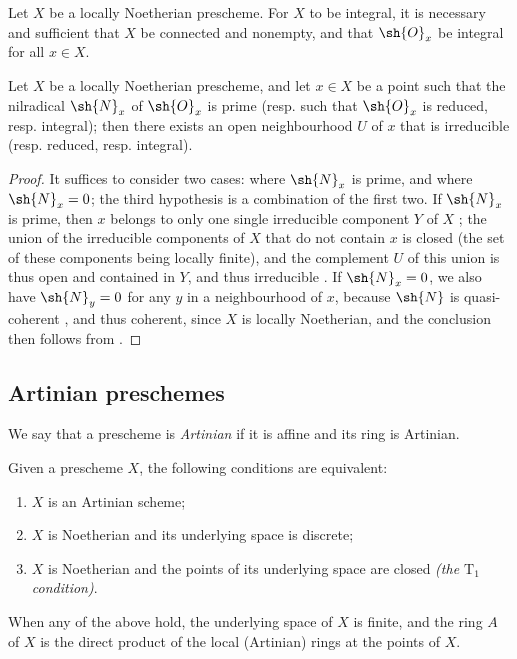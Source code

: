 \begin{corollary}[6.1.12]
\label{I.6.1.12}
Let $X$ be a locally Noetherian prescheme.
For $X$ to be integral, it is necessary and sufficient that $X$ be connected and nonempty, and that $\sh{O}_x$ be integral for all $x\in X$.
\end{corollary}

\begin{proposition}[6.1.13]
\label{I.6.1.13}
Let $X$ be a locally Noetherian prescheme, and let $x\in X$ be a point such that the nilradical $\sh{N}_x$ of $\sh{O}_x$ is prime (resp. such that $\sh{O}_x$ is reduced, resp. integral);
then there exists an open neighbourhood $U$ of $x$ that is irreducible (resp. reduced, resp. integral).
\end{proposition}

\begin{proof}
It suffices to consider two cases: where $\sh{N}_x$ is prime, and where $\sh{N}_x=0$; the third hypothesis is a combination of the first two.
If $\sh{N}_x$ is prime, then $x$ belongs to only one single irreducible component $Y$ of $X$ ;
the union of the irreducible components of $X$ that do not contain $x$ is closed (the set of these components being locally finite), and the complement $U$ of this union is thus open and contained in $Y$, and thus irreducible .
If $\sh{N}_x=0$, we also have $\sh{N}_y=0$ for any $y$ in a neighbourhood of $x$, because $\sh{N}$ is quasi-coherent , and thus coherent, since $X$ is locally Noetherian, and the conclusion then follows from .
\end{proof}

\subsection{Artinian preschemes}
\label{subsection:I.6.2}
\label{I.6.2}

\begin{definition}[6.2.1]
\label{I.6.2.1}
We say that a prescheme is \emph{Artinian} if it is affine and its ring is Artinian.
\end{definition}

\begin{proposition}[6.2.2]
\label{I.6.2.2}
Given
a prescheme $X$, the following conditions are equivalent:
\begin{enumerate}
  \item[{\rm(a)}] $X$ is an Artinian scheme;
  \item[{\rm(b)}] $X$ is Noetherian and its underlying space is discrete;
  \item[{\rm(c)}] $X$ is Noetherian and the points of its underlying space are closed \emph{(the $\mathrm{T}_1$ condition)}.
\end{enumerate}
When any of the above hold, the underlying space of $X$ is finite, and the ring $A$ of $X$ is the direct product of the local (Artinian) rings at the points of $X$.
\end{proposition}

